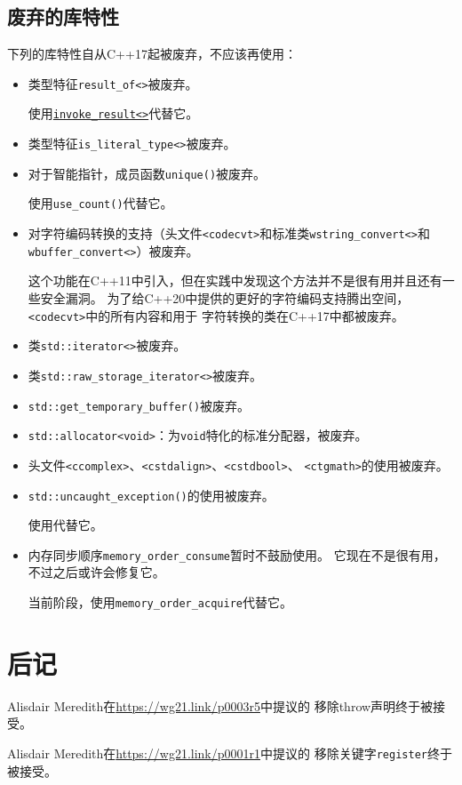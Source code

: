 \subsection{废弃的库特性}\label{ch35.2.7}
下列的库特性自从C++17起被废弃，不应该再使用：
\begin{itemize}
    \item 类型特征\texttt{result\_of<>}被废弃。

    使用\hyperref[ch21.2.0.5]{\texttt{invoke\_result<>}}代替它。
    \item 类型特征\texttt{is\_literal\_type<>}被废弃。
    \item 对于智能指针，成员函数\texttt{unique()}被废弃。

    使用\texttt{use\_count()}代替它。
    \item 对字符编码转换的支持（头文件\texttt{<codecvt>}和标准类\texttt{wstring\_convert<>}和
    \texttt{wbuffer\_convert<>}）被废弃。

    这个功能在C++11中引入，但在实践中发现这个方法并不是很有用并且还有一些安全漏洞。
    为了给C++20中提供的更好的字符编码支持腾出空间，\texttt{<codecvt>}中的所有内容和用于
    字符转换的类在C++17中都被废弃。
    \item 类\texttt{std::iterator<>}被废弃。
    \item 类\texttt{std::raw\_storage\_iterator<>}被废弃。
    \item \texttt{std::get\_temporary\_buffer()}被废弃。
    \item \texttt{std::allocator<void>}：为\texttt{void}特化的标准分配器，被废弃。
    \item 头文件\texttt{<ccomplex>}、\texttt{<cstdalign>}、\texttt{<cstdbool>}、
    \texttt{<ctgmath>}的使用被废弃。
    \item \texttt{std::uncaught\_exception()}的使用被废弃。

    使用代替它。
    \item 内存同步顺序\texttt{memory\_order\_consume}暂时不鼓励使用。
    它现在不是很有用，不过之后或许会修复它。

    当前阶段，使用\texttt{memory\_order\_acquire}代替它。
\end{itemize}


\section{后记}
Alisdair Meredith在\url{https://wg21.link/p0003r5}中提议的
移除throw声明终于被接受。

Alisdair Meredith在\url{https://wg21.link/p0001r1}中提议的
移除关键字\texttt{register}终于被接受。

